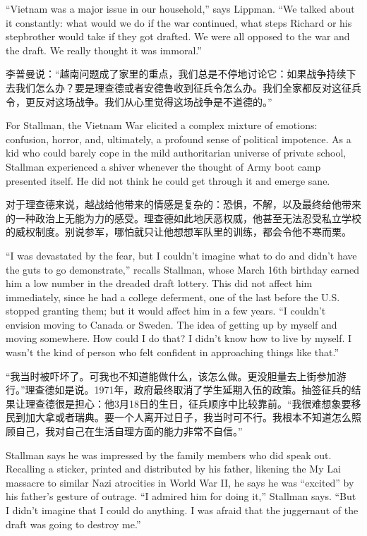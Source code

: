 \ifdefined\eng
``Vietnam was a major issue in our household,'' says Lippman. ``We talked about it constantly: what would we do if the war continued, what steps Richard or his stepbrother would take if they got drafted. We were all opposed to the war and the draft. We really thought it was immoral.''
\fi

\ifdefined\chs
李普曼说：``越南问题成了家里的重点，我们总是不停地讨论它：如果战争持续下去我们怎么办？要是理查德或者安德鲁收到征兵令怎么办。我们全家都反对这征兵令，更反对这场战争。我们从心里觉得这场战争是不道德的。''
\fi

\ifdefined\eng
For Stallman, the Vietnam War elicited a complex mixture of emotions: confusion, horror, and, ultimately, a profound sense of political impotence. As a kid who could barely cope in the mild authoritarian universe of private school, Stallman experienced a shiver whenever the thought of Army boot camp presented itself. He did not think he could get through it and emerge sane.
\fi

\ifdefined\chs
对于理查德来说，越战给他带来的情感是复杂的：恐惧，不解，以及最终给他带来的一种政治上无能为力的感受。理查德如此地厌恶权威，他甚至无法忍受私立学校的威权制度。别说参军，哪怕就只让他想想军队里的训练，都会令他不寒而栗。
\fi

\ifdefined\eng
``I was devastated by the fear, but I couldn't imagine what to do and didn't have the guts to go demonstrate,'' recalls Stallman, whose March 16th birthday earned him a low number in the dreaded draft lottery.  This did not affect him immediately, since he had a college deferment, one of the last before the U.S. stopped granting them; but it would affect him in a few years. ``I couldn't envision moving to Canada or Sweden. The idea of getting up by myself and moving somewhere. How could I do that? I didn't know how to live by myself. I wasn't the kind of person who felt confident in approaching things like that.''
\fi

\ifdefined\chs
``我当时被吓坏了。可我也不知道能做什么，该怎么做。更没胆量去上街参加游行。''理查德如是说。1971年，政府最终取消了学生延期入伍的政策。抽签征兵的结果让理查德很是担心：他3月18日的生日，征兵顺序中比较靠前。``我很难想象要移民到加大拿或者瑞典。要一个人离开过日子，我当时可不行。我根本不知道怎么照顾自己，我对自己在生活自理方面的能力非常不自信。''
\fi

\ifdefined\eng
Stallman says he was impressed by the family members who did speak out. Recalling a sticker, printed and distributed by his father, likening the My Lai massacre to similar Nazi atrocities in World War II, he says he was ``excited'' by his father's gesture of outrage. ``I admired him for doing it,'' Stallman says. ``But I didn't imagine that I could do anything. I was afraid that the juggernaut of the draft was going to destroy me.''
\fi

